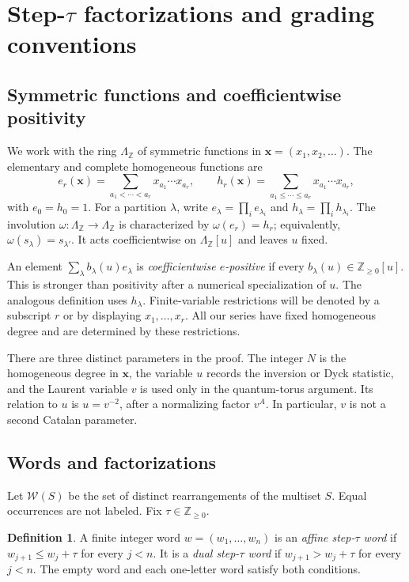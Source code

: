 \documentclass[11pt,reqno]{amsart}
\newcommand{\NN}{\mathbb Z_{\geq0}}
\newcommand{\ZZ}{\mathbb Z}
\newcommand{\xx}{\mathbf x}
\newcommand{\Sym}{\Lambda}
\newcommand{\WW}{\mathcal W}
\theoremstyle{definition}
\newtheorem{definition}[theorem]{Definition}
\theoremstyle{remark}
\numberwithin{equation}{section}
\begin{document}
\section{\texorpdfstring{Step-$\tau$}{Step-tau} factorizations and grading conventions}\label{sec:definitions}

\subsection{Symmetric functions and coefficientwise positivity}
We work with the ring $\Sym_\ZZ$ of symmetric functions in
$\xx=(x_1,x_2,\ldots)$.  The elementary and complete homogeneous functions
are
\[
 e_r(\xx)=\sum_{a_1<\cdots<a_r}x_{a_1}\cdots x_{a_r},\qquad
 h_r(\xx)=\sum_{a_1\leq\cdots\leq a_r}x_{a_1}\cdots x_{a_r},
\]
with $e_0=h_0=1$.  For a partition $\lambda$, write
$e_\lambda=\prod_i e_{\lambda_i}$ and
$h_\lambda=\prod_i h_{\lambda_i}$.  The involution
$\omega:\Sym_\ZZ\to\Sym_\ZZ$ is characterized by
$\omega(e_r)=h_r$; equivalently, $\omega(s_\lambda)=s_{\lambda'}$.
It acts coefficientwise on $\Sym_\ZZ[u]$ and leaves $u$ fixed.

An element $\sum_\lambda b_\lambda(u)e_\lambda$ is
\emph{coefficientwise $e$-positive} if every
$b_\lambda(u)\in\mathbb Z_{\geq0}[u]$.  This is stronger than positivity
after a numerical specialization of $u$.  The analogous definition
uses $h_\lambda$.  Finite-variable restrictions will be denoted by a
subscript $r$ or by displaying $x_1,\ldots,x_r$.  All our series have
fixed homogeneous degree and are determined by these restrictions.

There are three distinct parameters in the proof.  The integer $N$ is
the homogeneous degree in $\xx$, the variable $u$ records the inversion
or Dyck statistic, and the Laurent variable $v$ is used only in the
quantum-torus argument.  Its relation to $u$ is $u=v^{-2}$, after a
normalizing factor $v^A$.  In particular, $v$ is not a second Catalan
parameter.

\subsection{Words and factorizations}
Let $\WW(S)$ be the set of distinct rearrangements of the multiset $S$.
Equal occurrences are not labeled.  Fix $\tau\in\NN$.

\begin{definition}\label{def:words}
A finite integer word $w=(w_1,\ldots,w_n)$ is an \emph{affine step-$\tau$
word} if $w_{j+1}\leq w_j+\tau$ for every $j<n$.  It is a \emph{dual
step-$\tau$ word} if $w_{j+1}>w_j+\tau$ for every $j<n$.
The empty word and each one-letter word satisfy both conditions.
\end{definition}
\end{document}
